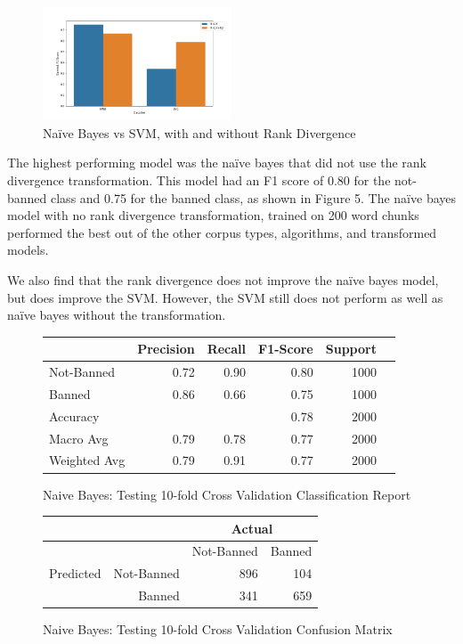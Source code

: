 \documentclass[11pt]{article}[twocolumn]
\begin{document}
\begin{figure}[H]
    \caption{Na\"ive Bayes vs SVM, with and without Rank Divergence}
    \centering
    \includegraphics[width=0.5\textwidth]{words200_clf_barplot.png}
\end{figure}

The highest performing model was the na\"ive bayes that did not use the rank divergence transformation.  This model had an F1 score of 0.80 for the not-banned class and 0.75 for the banned class, as shown in Figure 5.  The na\"ive bayes model with no rank divergence transformation, trained on 200 word chunks performed the best out of the other corpus types, algorithms, and transformed models.

We also find that the rank divergence does not improve the na\"ive bayes model, but does improve the SVM.  However, the SVM still does not perform as well as na\"ive bayes without the transformation.

\begin{figure}[H]
\begin{center}
\caption{Naive Bayes: Testing 10-fold Cross Validation Classification Report}
\begin{tabular}{|l|r|r|r|r|r}
\hline
    & Precision & Recall & F1-Score & Support \\
    \hline
    Not-Banned  & 0.72 & 0.90 & 0.80 & 1000\\
    Banned  & 0.86 & 0.66 & 0.75 & 1000\\
    \hline
    Accuracy  &  &  & 0.78 & 2000\\
    Macro Avg  & 0.79 & 0.78 & 0.77 & 2000\\
    Weighted Avg  & 0.79 & 0.91 & 0.77 & 2000\\
    \hline
\end{tabular}
\end{center}
\end{figure}

\begin{figure}[H]
\begin{center}
\caption{Naive Bayes: Testing 10-fold Cross Validation Confusion Matrix}
\begin{tabular}{|r|r|r|r|}
    \hline
    & & \multicolumn{2}{c|}{Actual}\\
        \hline
    \multirow{3}{*}{Predicted} &
    & Not-Banned & Banned \\
    \hline
    & Not-Banned  & 896 & 104\\
    & Banned  & 341 & 659\\
    \hline
\end{tabular}
\end{center}
\end{figure}
\end{document}
